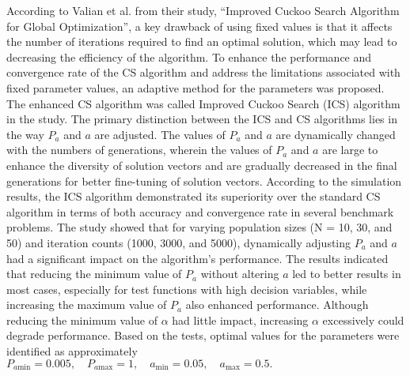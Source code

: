 According to Valian et al. \cite{valian2011improved} from their study, “Improved Cuckoo Search Algorithm for Global Optimization”, a key drawback of using fixed values is that it affects the number of iterations required to find an optimal solution, which may lead to decreasing the efficiency of the algorithm. To enhance the performance and convergence rate of the CS algorithm and address the limitations associated with fixed parameter values, an adaptive method for the parameters was proposed. The enhanced CS algorithm was called Improved Cuckoo Search (ICS) algorithm in the study. The primary distinction between the ICS and CS algorithms lies in the way $P_a$ and $a$ are adjusted. The values of $P_a$ and $a$ are dynamically changed with the numbers of generations, wherein the values of $P_a$ and $a$ are large to enhance the diversity of solution vectors and are gradually decreased in the final generations for better fine-tuning of solution vectors. According to the simulation results, the ICS algorithm demonstrated its superiority over the standard CS algorithm in terms of both accuracy and convergence rate in several benchmark problems. The study showed that for varying population sizes (N = 10, 30, and 50) and iteration counts (1000, 3000, and 5000), dynamically adjusting $P_a$ and $a$ had a significant impact on the algorithm's performance. The results indicated that reducing the minimum value of $P_a$ without altering $a$ led to better results in most cases, especially for test functions with high decision variables, while increasing the maximum value of $P_a$ also enhanced performance. Although reducing the minimum value of $\alpha$ had little impact, increasing $\alpha$ excessively could degrade performance. Based on the tests, optimal values for the parameters were identified as approximately  
$P_{a\text{min}} = 0.005, \quad P_{a\text{max}} = 1, \quad a_{\text{min}} = 0.05, \quad a_{\text{max}} = 0.5.$


